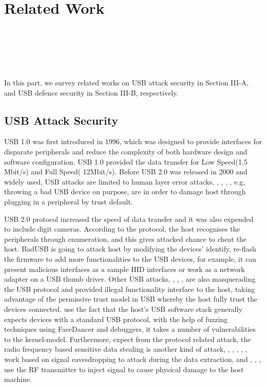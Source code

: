 \section{Related Work}
\label{sec:related_work}
\\
\\
\\
\\
\\

In this part, we survey related works on USB attack security in Section III-A, and USB defence security in Section III-B, respectively.
\subsection{USB Attack Security}
USB 1.0\cite{usb01} was first introduced in 1996, which was designed to provide interfaces for disparate peripherals and reduce the complexity of both hardware design and software configuration\cite{sok}. USB 1.0 provided the data transfer for Low Speed(1.5 Mbit/s) and Full Speed( 12Mbit/s). Before USB 2.0 was released in 2000 and widely used, USB attacks are limited to human layer error attacks, \cite{se}, \cite{goverment}, \cite{atkvec}, \cite{ueerreallydo}, e.g, throwing a bad USB device on purpose, are in order to damage host through plugging in a peripheral by trust default. 

USB 2.0 protocol increased the speed of data transfer and it was also expended to include digit cameras. According to the protocol, the host recognises the peripherals through enumeration, and this gives attacked chance to cheat the host. BadUSB\cite{badusb} is going to attack host by modifying the devices' identify, re-flash the firmware to add more functionalities to the USB devices, for example, it can present malicious interfaces as a sample HID interfaces or work as a network adapter on a USB thumb driver. Other USB attacks, \cite{rubber}, \cite{usbdriver}, \cite{usbbypassing}, \cite{iseeyou} are also masquerading the USB protocol and provided illegal functionality interface to the host, taking advantage of the permissive trust model in USB whereby the host fully trust the devices connected. \cite{syzkaller} use the fact that the host's USB software stack generally expects devices with a standard USB protocol, with the help of fuzzing techniques using FaceDancer \cite{facedancer} and debuggers, it takes a number of vulnerabilities to the kernel-model. Furthermore, expect from the protocol related attack, the radio frequency based sensitive data stealing is another kind of attack, \cite{smartphone} , \cite{poweremi}, \cite{badusbhub}, \cite{usbfinger}, \cite{side}, \cite{usbdriver} work based on signal eavesdropping to attack during the data extraction, and \cite{usbkiller}, \cite{cable}, \cite{usbee}, \cite{turnip} use the RF transmitter to inject signal to cause physical damage to the host machine.    

